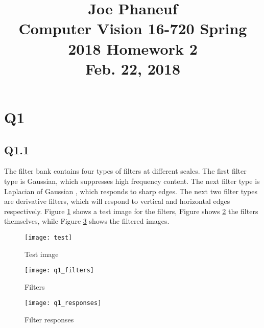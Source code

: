 \documentclass[12pt]{article}
\begin{document}
\title{Joe Phaneuf \\ Computer Vision 16-720 Spring 2018 Homework 2 \\ Feb. 22, 2018 }
\date{}
\author{}
\maketitle

\newpage


\section{Q1}
\subsection{Q1.1}

The filter bank contains four types of filters at different scales. The first filter type is Gaussian, which suppresses high frequency content. The next filter type is Laplacian of Gaussian , which responds to sharp edges. The next two filter types are derivative filters, which will respond to vertical and horizontal edges respectively.
Figure \ref{fig:test_image} shows a test image for the filters, Figure shows \ref{fig:filters} the filters themselves, while Figure \ref{fig:filter_responses} shows the filtered images.

\begin{figure}[H]
\centering
\texttt{[image: test]}
\caption{Test image}    
\label{fig:test_image}
\end{figure}   

\begin{figure}[H]
\centering
\texttt{[image: q1\_filters]}
\caption{Filters}    
\label{fig:filters}
\end{figure}   

\begin{figure}[H]
\centering
\texttt{[image: q1\_responses]}
\caption{Filter responses}    
\label{fig:filter_responses}
\end{figure}   

\newpage
\end{document}
